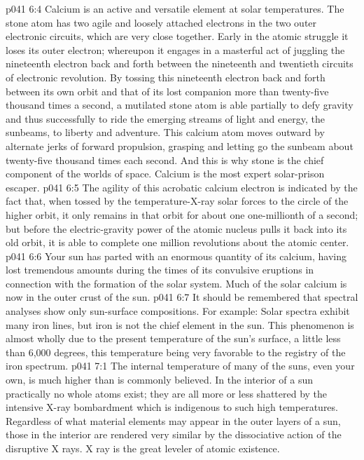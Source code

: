 \vs p041 6:4 Calcium is an active and versatile element at solar temperatures. The stone atom has two agile and loosely attached electrons in the two outer electronic circuits, which are very close together. Early in the atomic struggle it loses its outer electron; whereupon it engages in a masterful act of juggling the nineteenth electron back and forth between the nineteenth and twentieth circuits of electronic revolution. By tossing this nineteenth electron back and forth between its own orbit and that of its lost companion more than twenty\hyp{}five thousand times a second, a mutilated stone atom is able partially to defy gravity and thus successfully to ride the emerging streams of light and energy, the sunbeams, to liberty and adventure. This calcium atom moves outward by alternate jerks of forward propulsion, grasping and letting go the sunbeam about twenty\hyp{}five thousand times each second. And this is why stone is the chief component of the worlds of space. Calcium is the most expert solar\hyp{}prison escaper.
\vs p041 6:5 The agility of this acrobatic calcium electron is indicated by the fact that, when tossed by the temperature\hyp{}X\hyp{}ray solar forces to the circle of the higher orbit, it only remains in that orbit for about one one\hyp{}millionth of a second; but before the electric\hyp{}gravity power of the atomic nucleus pulls it back into its old orbit, it is able to complete one million revolutions about the atomic center.
\pc \vs p041 6:6 Your sun has parted with an enormous quantity of its calcium, having lost tremendous amounts during the times of its convulsive eruptions in connection with the formation of the solar system. Much of the solar calcium is now in the outer crust of the sun.
\pc \vs p041 6:7 It should be remembered that spectral analyses show only sun\hyp{}surface compositions. For example: Solar spectra exhibit many iron lines, but iron is not the chief element in the sun. This phenomenon is almost wholly due to the present temperature of the sun’s surface, a little less than 6,000 degrees, this temperature being very favorable to the registry of the iron spectrum.
\vs p041 7:1 The internal temperature of many of the suns, even your own, is much higher than is commonly believed. In the interior of a sun practically no whole atoms exist; they are all more or less shattered by the intensive X\hyp{}ray bombardment which is indigenous to such high temperatures. Regardless of what material elements may appear in the outer layers of a sun, those in the interior are rendered very similar by the dissociative action of the disruptive X rays. X ray is the great leveler of atomic existence.
